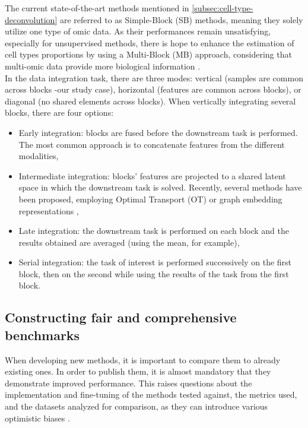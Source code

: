 \documentclass{article}
\begin{document}
The current state-of-the-art methods mentioned in \ref{subsec:cell-type-deconvolution} are referred to as Simple-Block (SB) methods, meaning they solely utilize one type of omic data.
As their performances remain unsatisfying, especially for unsupervised methods, there is hope to enhance the estimation of cell types proportions by using a Multi-Block (MB) approach, considering that multi-omic data provide more biological information \cite{ebrahim_2016_multi}. \\

In the data integration task, there are three modes: vertical (samples are common across blocks -our study case), horizontal (features are common across blocks), or diagonal (no shared elements across blocks). 
When vertically integrating several blocks, there are four options:
\begin{itemize}
    \item Early integration: blocks are fused before the downstream task is performed. The most common approach is to concatenate features from the different modalities,
    \item Intermediate integration: blocks' features are projected to a shared latent space in which the downstream task is solved. Recently, several methods have been proposed, employing Optimal Transport (OT) \cite{uniPort} or graph embedding representations \cite{MultiMAP, GLUE, MultiXrank},
    \item Late integration: the downstream task is performed on each block and the results obtained are averaged (using the mean, for example),
    \item Serial integration: the task of interest is performed successively on the first block, then on the second while using the results of the task from the first block.
\end{itemize}

\subsection{Constructing fair and comprehensive benchmarks}\label{subsec:constructing-robust-benchmarks}

When developing new methods, it is important to compare them to already existing ones.
In order to publish them, it is almost mandatory that they demonstrate improved performance.
This raises questions about the implementation and fine-tuning of the methods tested against, the metrics used, and the datasets analyzed for comparison, as they can introduce various optimistic biases \cite{buchka_2021_evaluation}.
\end{document}
